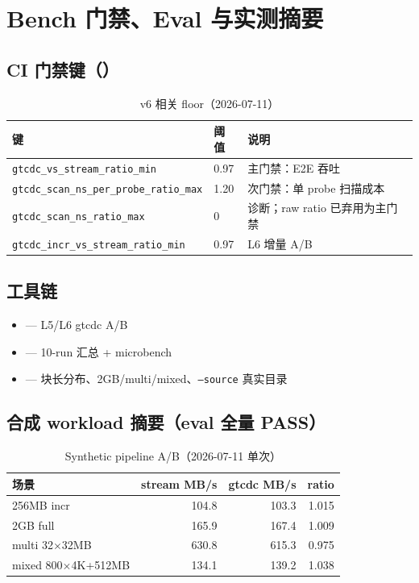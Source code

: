 \chapter{Bench 门禁、Eval 与实测摘要}
\label{ch:bench}

\section{CI 门禁键（）}

\begin{table}[htbp]
\centering
\caption{v6 相关 floor（2026-07-11）}
\small
\begin{tabular}{@{}lll@{}}
\toprule
\textbf{键} & \textbf{阈值} & \textbf{说明} \\
\midrule
\texttt{gtcdc\_vs\_stream\_ratio\_min} & 0.97 & 主门禁：E2E 吞吐 \\
\texttt{gtcdc\_scan\_ns\_per\_probe\_ratio\_max} & 1.20 & 次门禁：单 probe 扫描成本 \\
\texttt{gtcdc\_scan\_ns\_ratio\_max} & 0 & 诊断；raw ratio 已弃用为主门禁 \\
\texttt{gtcdc\_incr\_vs\_stream\_ratio\_min} & 0.97 & L6 增量 A/B \\
\bottomrule
\end{tabular}
\end{table}

\section{工具链}

\begin{itemize}[nosep]
  \item {} — L5/L6 gtcdc A/B
  \item {} — 10-run 汇总 + microbench
  \item {} — 块长分布、2GB/multi/mixed、\texttt{--source} 真实目录
\end{itemize}

\section{合成 workload 摘要（eval 全量 PASS）}

\begin{table}[htbp]
\centering
\caption{Synthetic pipeline A/B（2026-07-11 单次）}
\small
\begin{tabular}{@{}lrrr@{}}
\toprule
场景 & stream MB/s & gtcdc MB/s & ratio \\
\midrule
256MB incr & 104.8 & 103.3 & 1.015 \\
2GB full & 165.9 & 167.4 & 1.009 \\
multi 32$\times$32MB & 630.8 & 615.3 & 0.975 \\
mixed 800$\times$4K+512MB & 134.1 & 139.2 & 1.038 \\
\bottomrule
\end{tabular}
\end{table}

